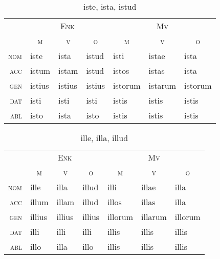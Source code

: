 \documentclass[12pt,a4paper]{article}
\begin{document}
\begin{table}[H]
\centering
\begin{tabular}{ r | l l l | l l l }
\toprule
 & \multicolumn{3}{c|}{\textsc{Enk}} & \multicolumn{3}{c}{\textsc{Mv}} \\
 & \multicolumn{1}{c}{\textsc{m}} & \multicolumn{1}{c}{\textsc{v}} & \multicolumn{1}{c|}{\textsc{o}} & \multicolumn{1}{c}{\textsc{m}} & \multicolumn{1}{c}{\textsc{v}} & \multicolumn{1}{c}{\textsc{o}} \\ 
\midrule
\textsc{nom} & iste   & ista   & istud  & isti    & istae   & ista    \\
\textsc{acc} & istum  & istam  & istud  & istos   & istas   & ista    \\
\textsc{gen} & istius & istius & istius & istorum & istarum & istorum \\
\textsc{dat} & isti   & isti   & isti   & istis   & istis   & istis   \\
\textsc{abl} & isto   & ista   & isto   & istis   & istis   & istis   \\
\bottomrule
\end{tabular}
\caption{iste, ista, istud}
\label{tab:iste}
\end{table}

\begin{table}[H]
\centering
\begin{tabular}{ r | l l l | l l l }
\toprule
 & \multicolumn{3}{c|}{\textsc{Enk}} & \multicolumn{3}{c}{\textsc{Mv}} \\
 & \multicolumn{1}{c}{\textsc{m}} & \multicolumn{1}{c}{\textsc{v}} & \multicolumn{1}{c|}{\textsc{o}} & \multicolumn{1}{c}{\textsc{m}} & \multicolumn{1}{c}{\textsc{v}} & \multicolumn{1}{c}{\textsc{o}} \\ 
\midrule
\textsc{nom} & ille   & illa   & illud  & illi    & illae   & illa    \\
\textsc{acc} & illum  & illam  & illud  & illos   & illas   & illa    \\
\textsc{gen} & illius & illius & illius & illorum & illarum & illorum \\
\textsc{dat} & illi   & illi   & illi   & illis   & illis   & illis   \\
\textsc{abl} & illo   & illa   & illo   & illis   & illis   & illis   \\
\bottomrule
\end{tabular}
\caption{ille, illa, illud}
\label{tab:ille}
\end{table}
\end{document}
